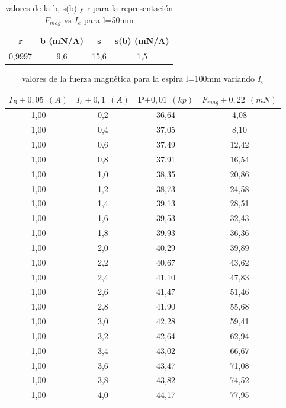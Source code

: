 \documentclass[12pt,a4paper]{book}
\begin{document}
\begin{table}[h!]
\begin{center}
\begin{tabular}{|c|c|c|c|}
\hline
r & 	 b  (mN/A) & 	 s & 	 s(b)  (mN/A) \\ \hline
0,9997 & 	 9,6 & 	 15,6 & 	 1,5 \\ 
\hline
\end{tabular}
\end{center}
\caption{valores de la b, s(b) y r para la representación $F_{mag}$ vs $I_e$ para l=50mm}
\end{table} 

\newpage


\vspace*{2.5cm} 


\begin{table}[h!]
\begin{center}
\begin{tabular}{|c|c|c|c|}
\hline
$I_B  \pm 0,05 \ \  (A)$ & 	 $I_e \pm 0,1 \ \ (A) $ & 	 P$\pm 0,01\ \ (kp)$ & 	 $F_{mag} \pm 0,22 \ \ (mN)$ \\ \hline
1,00 & 	 0,2 & 	 36,64 & 	 4,08 \\
1,00 & 	 0,4 & 	 37,05 & 	 8,10 \\
1,00 & 	 0,6 & 	 37,49 & 	 12,42 \\
1,00 & 	 0,8 & 	 37,91 & 	 16,54 \\
1,00 & 	 1,0 & 	 38,35 & 	 20,86 \\
1,00 & 	 1,2 & 	 38,73 & 	 24,58 \\
1,00 & 	 1,4 & 	 39,13 & 	 28,51 \\
1,00 & 	 1,6 & 	 39,53 & 	 32,43 \\
1,00 & 	 1,8 & 	 39,93 & 	 36,36 \\
1,00 & 	 2,0 & 	 40,29 & 	 39,89 \\
1,00 & 	 2,2 & 	 40,67 & 	 43,62 \\
1,00 & 	 2,4 & 	 41,10 & 	 47,83 \\
1,00 & 	 2,6 & 	 41,47 & 	 51,46 \\
1,00 & 	 2,8 & 	 41,90 & 	 55,68 \\
1,00 & 	 3,0 & 	 42,28 & 	 59,41 \\
1,00 & 	 3,2 & 	 42,64 & 	 62,94 \\
1,00 & 	 3,4 & 	 43,02 & 	 66,67 \\
1,00 & 	 3,6 & 	 43,47 & 	 71,08 \\
1,00 & 	 3,8 & 	 43,82 & 	 74,52 \\
1,00 & 	 4,0 & 	 44,17 & 	 77,95 \\
\hline
\end{tabular}
\end{center}
\caption{valores de la fuerza magnética para la espira l=100mm variando $I_e$}
\end{table}
\end{document}
